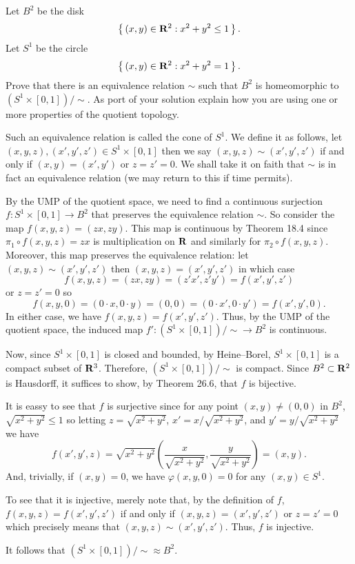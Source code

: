 \begin{problem}
  Let $B^2$ be the disk
  \[
    \left\{\,(x,y)\in\mathbf{R}^2:x^2+y^2\leq 1\,\right\}.
  \]
  Let $S^1$ be the circle
  \[
    \left\{\,(x,y)\in\mathbf{R}^2:x^2+y^2=1\,\right\}.
  \]
  Prove that there is an equivalence relation $\sim$ such that $B^2$ is
  homeomorphic to $(S^1\times[0,1])/{\sim}$. As port of your solution
  explain how you are using one or more properties of the quotient
  topology.
\end{problem}
\begin{solution}
  Such an equivalence relation is called the cone of $S^1$. We define it as
  follows, let $(x,y,z),(x',y',z')\in S^1\times[0,1]$ then we say
  $(x,y,z)\sim(x',y',z')$ if and only if $(x,y)=(x',y')$ or $z=z'=0$. We
  shall take it on faith that $\sim$ is in fact an equivalence relation (we
  may return to this if time permits).

  By the UMP of the quotient space, we need to find a continuous surjection
  $f\colon S^1\times[0,1]\to B^2$ that preserves the equivalence relation
  $\sim$. So consider the map $f(x,y,z)=(zx,zy)$. This map is continuous by
  Theorem 18.4 since $\pi_1\circ f(x,y,z)=zx$ is multiplication on $\mathbf{R}$
  and similarly for $\pi_2\circ f(x,y,z)$. Moreover, this map preserves the
  equivalence relation: let $(x,y,z)\sim(x',y',z')$ then
  $(x,y,z)=(x',y',z')$ in which case
  \[
    f(x,y,z)=(zx,zy)=(z'x',z'y')=f(x',y',z')
  \]
  or $z=z'=0$ so
  \[
    f(x,y,0)=(0\cdot x,0\cdot y)=(0,0)=(0\cdot x',0\cdot y')=f(x',y',0).
  \]
  In either case, we have $f(x,y,z)=f(x',y',z')$. Thus, by the UMP of the
  quotient space, the induced map $f'\colon (S^1\times[0,1])/{\sim}\to B^2$
  is continuous.

  Now, since $S^1\times[0,1]$ is closed and bounded, by Heine--Borel,
  $S^1\times[0,1]$ is a compact subset of $\mathbf{R}^3$. Therefore,
  $(S^1\times[0,1])/{\sim}$ is compact. Since $B^2\subset\mathbf{R}^2$ is
  Hausdorff, it suffices to show, by Theorem 26.6, that $f$ is bijective.

  It is eassy to see that $f$ is surjective since for any point
  $(x,y)\neq(0,0)$ in $B^2$, $\sqrt{x^2+y^2}\leq 1$ so letting
  $z=\sqrt{x^2+y^2}$, $x'=x/\sqrt{x^2+y^2}$, and $y'=y/\sqrt{x^2+y^2}$ we
  have
  \[
    f(x',y',z)=\sqrt{x^2+y^2} \left(\frac{x}{\sqrt{x^2+y^2}},
      \frac{y}{\sqrt{x^2+y^2}}\right)=(x,y).
  \]
  And, trivially, if $(x,y)=0$, we have $\varphi(x,y,0)=0$ for any
  $(x,y)\in S^1$.

  To see that it is injective, merely note that, by the definition of $f$,
  $f(x,y,z)=f(x',y',z')$ if and only if $(x,y,z)=(x',y',z')$ or $z=z'=0$
  which precisely means that $(x,y,z)\sim(x',y',z')$. Thus, $f$ is
  injective.

  It follows that $(S^1\times[0,1])/{\sim}\approx B^2$.
\end{solution}

